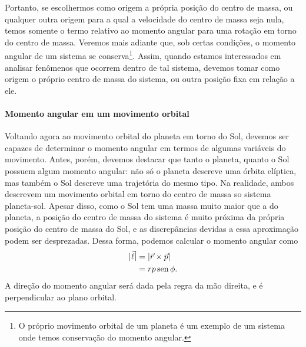 Portanto, se escolhermos como origem a própria posição do centro de massa, ou qualquer outra origem para a qual a velocidade do centro de massa seja nula, temos somente o termo relativo ao momento angular para uma rotação em torno do centro de massa. Veremos mais adiante que, sob certas condições, o momento angular de um sistema se conserva\footnote{O próprio movimento orbital de um planeta é um exemplo de um sistema onde temos conservação do momento angular.}. Assim, quando estamos interessados em analisar fenômenos que ocorrem dentro de tal sistema, devemos tomar como origem o próprio centro de massa do sistema, ou outra posição fixa em relação a ele.

\paragraph{Momento angular em um movimento orbital}

Voltando agora ao movimento orbital do planeta em torno do Sol, devemos ser capazes de determinar o momento angular em termos de algumas variáveis do movimento. Antes, porém, devemos destacar que tanto o planeta, quanto o Sol possuem algum momento angular: não só o planeta descreve uma órbita elíptica, mas também o Sol descreve uma trajetória do mesmo tipo. Na realidade, ambos descrevem um movimento orbital em torno do centro de massa so sistema planeta-sol. Apesar disso, como o Sol tem uma massa muito maior que a do planeta, a posição do centro de massa do sistema é muito próxima da própria posição do centro de massa do Sol, e as discrepâncias devidas a essa aproximação podem ser desprezadas. Dessa forma, podemos calcular o momento angular como
\begin{align}
    |\vec{\ell}| &= |\vec{r} \times \vec{p}| \\
    &= r p \operatorname{sen} \phi.
\end{align}
%
A direção do momento angular será dada pela regra da mão direita, e é perpendicular ao plano orbital.

